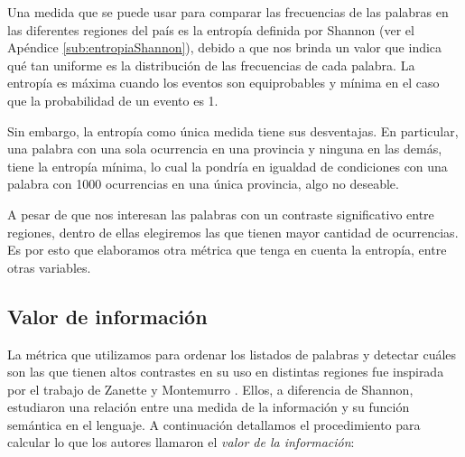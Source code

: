 Una medida que se puede usar para comparar las frecuencias de las palabras en las diferentes regiones del país es la entropía definida por Shannon (ver el Apéndice \ref{sub:entropiaShannon}), debido a que nos brinda un valor que indica qué tan uniforme es la distribución de las frecuencias de cada palabra. La entropía es máxima cuando los eventos son equiprobables y mínima en el caso que la probabilidad de un evento es 1.

Sin embargo, la entropía como única medida tiene sus desventajas. En particular, una palabra con una sola ocurrencia en una provincia y ninguna en las demás, tiene la entropía mínima, lo cual la pondría en igualdad de condiciones con una palabra con 1000 ocurrencias en una única provincia, algo no deseable.

A pesar de que nos interesan las palabras con un contraste significativo entre regiones, dentro de ellas elegiremos las que tienen mayor cantidad de ocurrencias. Es por esto que elaboramos otra métrica que tenga en cuenta la entropía, entre otras variables.


\subsection{Valor de información}
La métrica que utilizamos para ordenar los listados de palabras y detectar cuáles son
las que tienen altos contrastes en su uso en distintas regiones fue inspirada por el
trabajo de Zanette y Montemurro \cite{montemurro2010towards}.
Ellos, a diferencia de Shannon, estudiaron una relación entre una medida de la información y su función semántica en el lenguaje.
A continuación detallamos el procedimiento para calcular lo que los autores llamaron
el \textit{valor de la información}:


